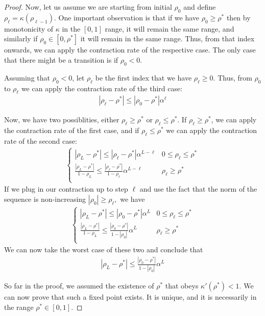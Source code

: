 \begin{proof}
Now, let us assume we are starting from initial $\rho_0$ and define $\rho_\ell = \kappa(\rho_{\ell-1})$. One important observation is that if we have $\rho_0 \ge \rho^*$ then by monotonicity of $\kappa$ in the $[0,1]$ range, it will remain the same range, and similarly if $\rho_0\in[0,\rho^*]$ it will remain in the same range. Thus, from that index onwards, we can apply the contraction rate of the respective case. The only case that there might be a transition is if $\rho_0 < 0$. 

Assuming that $\rho_0 < 0$, let $\rho_\ell$ be the first index that we have $\rho_\ell \ge 0$. Thus, from $\rho_0$ to $\rho_\ell$ we can apply the contraction rate of the third case:
\begin{align*}
|\rho_\ell - \rho^*| \le |\rho_0 - \rho^*| \alpha^\ell
\end{align*}

Now, we have two possiblities, either $\rho_\ell \ge \rho^*$ or $\rho_\ell \le \rho^*$. If $\rho_\ell \ge \rho^*$, we can apply the contraction rate of the first case, and if $\rho_\ell \le \rho^*$ we can apply the contraction rate of the second case:
\begin{align*}
    \begin{cases}
|\rho_L - \rho^*| \le |\rho_\ell - \rho^*| \alpha^{L-\ell} & 0\le \rho_\ell\le \rho^*\\
\frac{|\rho_L-\rho^*|}{1-\rho_L} \le \frac{|\rho_\ell-\rho^*|}{1-\rho_\ell}\alpha^{L-\ell} & \rho_\ell\ge \rho^* \\
    \end{cases}
\end{align*}
If we plug in our contraction up to step $\ell$ and use the fact that the norm of the sequence is non-increasing $|\rho_0|\ge \rho_\ell,$ we have
\begin{align*}
    \begin{cases}
|\rho_L - \rho^*| \le |\rho_0 - \rho^*| \alpha^{L} & 0\le \rho_\ell\le \rho^*\\
\frac{|\rho_L-\rho^*|}{1-\rho_L} \le \frac{|\rho_0-\rho^*|}{1-|\rho_0|}\alpha^{L} & \rho_\ell\ge \rho^* \\
    \end{cases}
\end{align*}
We can now take the worst case of these two and conclude that
\begin{align*}
|\rho_L - \rho^*| \le \frac{|\rho_0 - \rho^*|}{1-|\rho_0|} \alpha^L
\end{align*}

So far in the proof, we assumed the existence of $\rho^*$ that obeys $\kappa'(\rho^*)<1.$ We can now prove that such a fixed point exists. It is unique, and it is necessarily in the range $\rho^*\in [0,1].$


\end{proof}

